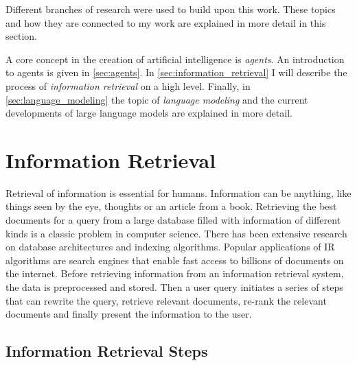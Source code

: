 \documentclass[../main.tex]{subfiles}
\begin{document}
Different branches of research were used to build upon this work.
These topics and how they are connected to my work
are explained in more detail in this section.

A core concept in the creation of artificial intelligence is \emph{agents}.
An introduction to agents is given in \autoref{sec:agents}.
In \autoref{sec:information_retrieval} I will describe the process of \emph{information retrieval} on a high level.
Finally, in \autoref{sec:language_modeling} the topic of \emph{language modeling}
and the current developments of large language models are explained in more detail.

\section{Information Retrieval}
\label{sec:information_retrieval}
Retrieval of information is essential for humans.
Information can be anything, like things seen by the eye, thoughts or an article from a book.
Retrieving the best documents for a query from a large database
filled with information of different kinds is a classic problem in computer science.
There has been extensive research on database architectures and indexing algorithms.
Popular applications of IR algorithms are search engines that enable fast access to billions of documents on the internet.
Before retrieving information from an information retrieval system,
the data is preprocessed and stored.
Then a user query initiates a series of steps that can rewrite the query, retrieve relevant documents,
re-rank the relevant documents and finally present the information to the user.

\subsection{Information Retrieval Steps}
\end{document}
